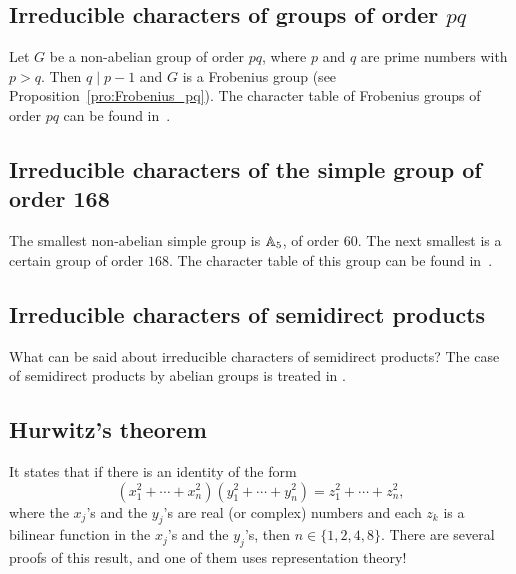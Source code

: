 


\subsection*{Irreducible characters of groups of order $pq$}

Let $G$ be a non-abelian 
group of order $pq$, where 
$p$ and $q$ are prime numbers with $p>q$. Then 
$q\mid p-1$ and $G$ is a Frobenius group (see
Proposition~\ref{pro:Frobenius_pq}). 
The character table of Frobenius groups of order $pq$ can be found in~\cite[Chapter 25]{MR1864147}.

\subsection*{Irreducible characters of the simple group of order 168}

The smallest non-abelian simple group is $\mathbb{A}_5$, of
order $60$. The next smallest
is a certain group of order $168$. The character
table of this group can be found in~\cite[Chapter 27]{MR1864147}. 

\subsection*{Irreducible characters of semidirect products}

What can be said about irreducible characters
of semidirect products? The case of 
semidirect products by abelian groups is treated 
in \cite[Section 8.2]{MR0450380}.

\subsection*{Hurwitz's theorem}

It states that 
if there is an identity of the form 
	\begin{equation*}
		(x_1^2+\cdots+x_n^2)(y_1^2+\cdots+y_n^2)=z_1^2+\cdots+z_n^2,
	\end{equation*}
	where the $x_j$'s and the $y_j$'s are real (or complex) numbers and
	each $z_k$ is a bilinear function in the $x_j$'s and the $y_j$'s, then 
	$n\in\{1,2,4,8\}$. There are several 
    proofs of this result, and one of them uses representation theory! 

